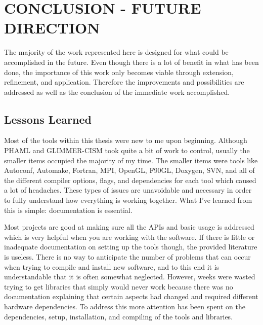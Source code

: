 \section{CONCLUSION - FUTURE DIRECTION} \label{ch:conclusion}


The majority of the work represented here is designed for what could be accomplished in the future.  Even though there is a lot of benefit in what has been done, the importance of this work only becomes viable through extension, refinement, and application.  Therefore the improvements and possibilities are addressed as well as the conclusion of the immediate work accomplished.

\subsection{Lessons Learned}\label{sec:chp6lessons}

Most of the tools within this thesis were new to me upon beginning.  Although PHAML and GLIMMER-CISM took quite a bit of work to control, usually the smaller items occupied the majority of my time.  The smaller items were tools like Autoconf, Automake, Fortran, MPI, OpenGL, F90GL, Doxygen, SVN, and all of the different compiler options, flags, and dependencies for each tool which caused a lot of headaches.  These types of issues are unavoidable and necessary in order to fully understand how everything is working together.  What I've learned from this is simple:  documentation is essential.

Most projects are good at making sure all the APIs and basic usage is addressed which is very helpful when you are working with the software.  If there is little or inadequate documentation on setting up the tools though, the provided literature is useless.  There is no way to anticipate the number of problems that can occur when trying to compile and install new software, and to this end it is understandable that it is often somewhat neglected.  However, weeks were wasted trying to get libraries that simply would never work because there was no documentation explaining that certain aspects had changed and required different hardware dependencies.  To address this more attention has been spent on the dependencies, setup, installation, and compiling of the tools and libraries.

